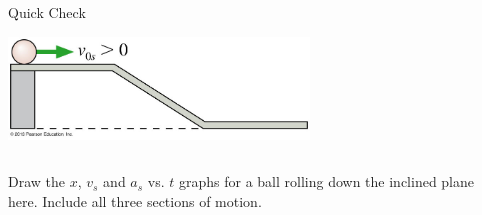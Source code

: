 \documentclass{beamer}
\begin{document}
\begin{frame}{Quick Check}
\begin{center}
   \includegraphics[width=0.6\textwidth]{../figures/02_35_Figure.jpg}
\end{center}
\begin{columns}
\begin{column}{0.5\textwidth}
\begin{center}
   Draw the $x$, $v_s$ and $a_s$ vs. $t$ graphs for a ball rolling down the inclined plane here. Include all three sections of motion.
\end{center}
\end{column}
\begin{column}{0.5\textwidth}
\end{column}
\end{columns}
\end{frame}
\end{document}
